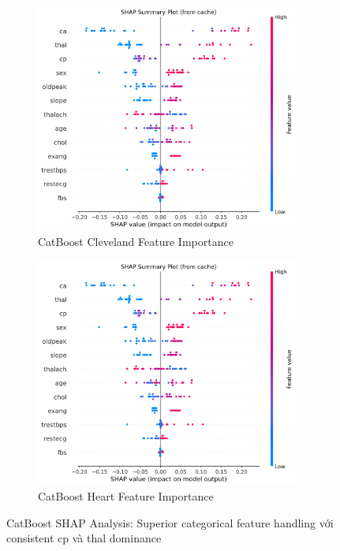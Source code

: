 \begin{figure}[H]
\centering
\begin{subfigure}[b]{0.48\textwidth}
\centering
\includegraphics[width=0.95\textwidth]{Result/cleveland_dataset/Catboost/SHAP/Summary.png}
\caption{CatBoost Cleveland Feature Importance}
\label{fig:catboost_shap_cleveland}
\end{subfigure}
\hfill
\begin{subfigure}[b]{0.48\textwidth}
\centering
\includegraphics[width=0.95\textwidth]{Result/heart_dataset/Catboost/SHAP/Summary.png}
\caption{CatBoost Heart Feature Importance}
\label{fig:catboost_shap_heart}
\end{subfigure}
\caption{CatBoost SHAP Analysis: Superior categorical feature handling với consistent cp và thal dominance}
\label{fig:ra-catboost_shap_comparison}
\end{figure}

